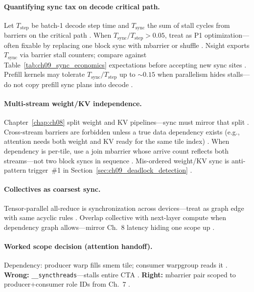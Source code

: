 \paragraph{Quantifying sync tax on decode critical path.}
Let $T_{\mathrm{step}}$ be batch-1 decode step time and $T_{\mathrm{sync}}$ the sum of stall cycles from barriers on the critical path \citep{patel2025llminference,shah2024flashattention3}.
When $T_{\mathrm{sync}} / T_{\mathrm{step}} > 0.05$, treat as P1 optimization---often fixable by replacing one block sync with mbarrier or shuffle \citep{semianalysis2024tma,taxbreak2026}.
Nsight exports $T_{\mathrm{sync}}$ via barrier stall counters; compare against Table~\ref{tab:ch09_sync_economics} expectations before accepting new sync sites \citep{nvidia2022hopper,yirage2026}.
Prefill kernels may tolerate $T_{\mathrm{sync}} / T_{\mathrm{step}}$ up to ${\sim}0.15$ when parallelism hides stalls---do not copy prefill sync plans into decode \citep{kwon2023vllm,memoryfloor2026,patel2025llminference}.

\paragraph{Multi-stream weight/KV independence.}
Chapter~\ref{chap:ch08} split weight and KV pipelines---sync must mirror that split \citep{semianalysis2024tma,kwon2023vllm,dao2023flashdecoding}.
Cross-stream barriers are forbidden unless a true data dependency exists (e.g., attention needs both weight and KV ready for the same tile index) \citep{shah2024flashattention3,dao2022flashattention}.
When dependency is per-tile, use a join mbarrier whose arrive count reflects both streams---not two block syncs in sequence \citep{yirage2026,semianalysis2024tma,chen2020compilerbasedhardw}.
Mis-ordered weight/KV sync is anti-pattern trigger~\#1 in Section~\ref{sec:ch09_deadlock_detection} \citep{taxbreak2026,patel2025llminference}.

\paragraph{Collectives as coarsest sync.}
Tensor-parallel all-reduce is synchronization across devices---treat as graph edge with same acyclic rules \citep{patel2025llminference,dlbook,mpk2025}.
Overlap collective with next-layer compute when dependency graph allows---mirror Ch.~8 latency hiding one scope up \citep{shah2024flashattention3,yirage2026}.

\paragraph{Worked scope decision (attention handoff).}
Dependency: producer warp fills smem tile; consumer warpgroup reads it \citep{shah2024flashattention3,semianalysis2024tma}.
\textbf{Wrong:} \texttt{\_\_syncthreads}---stalls entire CTA \citep{nvidia2022hopper,patel2025llminference}.
\textbf{Right:} mbarrier pair scoped to producer+consumer role IDs from Ch.~7 \citep{yirage2026,dao2022flashattention,chen2020compilerbasedhardw}.

